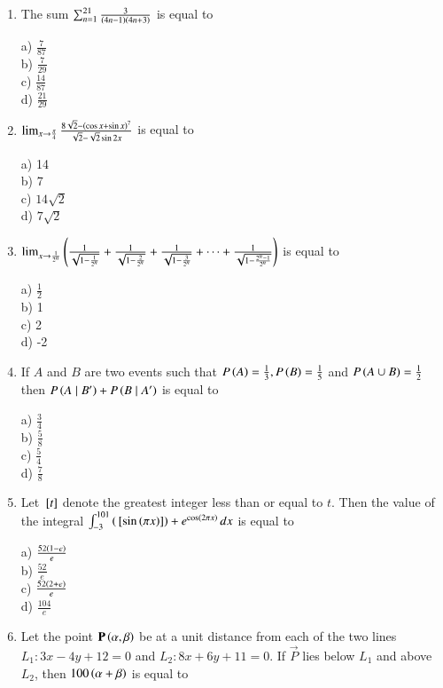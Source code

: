 \documentclass[journal]{IEEEtran}
\begin{document}
\begin{enumerate}
\item The sum $\sum_{n=1}^{21} \frac{3}{\left(4n-1\right)\left(4n+3\right)}$ is equal to 
\begin{multicols}{4}
    a) $\frac{7}{87}$\\
    b) $\frac{7}{29}$\\
    c) $\frac{14}{87}$\\
    d) $\frac{21}{29}$
\end{multicols}
\item $\lim_{x \to \frac{\pi}{4}} \frac{8\sqrt{2}-\left(\cos x +\sin x\right)^7}{\sqrt{2}-\sqrt{2}\sin 2x}$ is equal to 
\begin{multicols}{4}
    a) 14\\
    b) 7\\
    c) $14\sqrt{2}$\\
    d) $7\sqrt{2}$
\end{multicols}
\item $\lim_{x \to \frac{1}{2^n}} \left(\frac{1}{\sqrt{1-\frac{1}{2^n}}}+\frac{1}{\sqrt{1-\frac{2}{2^n}}}+\frac{1}{\sqrt{1-\frac{3}{2^n}}}+\dots +\frac{1}{\sqrt{1-\frac{2^n -1}{2^n}}}\right)$ is equal to 
\begin{multicols}{4}
    a) $\frac{1}{2}$\\
    b) 1\\
    c) 2\\
    d) -2
\end{multicols}
\item If $A$ and $B$ are two events such that $P\left(A\right)=\frac{1}{3}, P\left(B\right)=\frac{1}{5}$ and $P\left(A\cup B\right)=\frac{1}{2}$ then $P\left(A\mid B^{\prime}\right)+P\left(B\mid A^{\prime}\right)$ is equal to 
\begin{multicols}{4}
    a) $\frac{3}{4}$\\
    b) $\frac{5}{8}$\\
    c) $\frac{5}{4}$\\
    d) $\frac{7}{8}$
\end{multicols}
\item Let ${}\left[t\right]$ denote the greatest integer less than or equal to $t$. Then the value of the integral $\int_{-3}^{101} \left({}\left[\sin\left(\pi x\right)\right]\right)+e^{\cos\left(2\pi x\right)} \, dx$ is equal to 
\begin{multicols}{4}
    a) $\frac{52\left(1-e\right)}{e}$\\
    b) $\frac{52}{e}$\\
    c) $\frac{52\left(2+e\right)}{e}$\\
    d) $\frac{104}{e}$
\end{multicols}
\item Let the point $\mathbf{P}\left(\alpha,\beta\right)$ be at a unit distance from each of the two lines $L_1:3x-4y+12=0$ and $L_2:8x+6y+11=0$. If $\vec{P}$ lies below $L_1$ and above $L_2$, then $100\left(\alpha+\beta\right)$ is equal to 

\end{enumerate}
\end{document}
